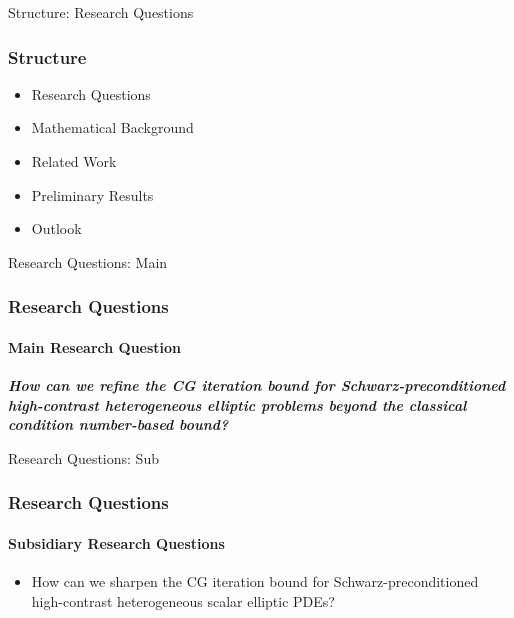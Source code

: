 \begin{frame}{Structure: Research Questions}
    \frametitle{Structure}
    \begin{itemize}
        \item {\color{tud grapefruit}Research Questions}
        \item Mathematical Background
        \item Related Work
        \item Preliminary Results
        \item Outlook
    \end{itemize}
\end{frame}

\begin{frame}[label=questions]{Research Questions: Main}
    \frametitle{Research Questions}
    \framesubtitle{Main Research Question}
    \vspace{0.2\pageheight}
    \begin{center}
    \textit{\textbf{How can we refine the CG iteration bound for Schwarz-preconditioned high-contrast heterogeneous elliptic problems beyond the classical condition number-based bound?}}
    \end{center}
\end{frame}

\begin{frame}[label=questions]{Research Questions: Sub}
    \frametitle{Research Questions}
    \framesubtitle{Subsidiary Research Questions}
    \setlength\itemindent{1in}
    \begin{itemize}
        \item How can we sharpen the CG iteration bound for Schwarz-preconditioned high-contrast heterogeneous scalar elliptic PDEs?
    \end{itemize}
\end{frame}


